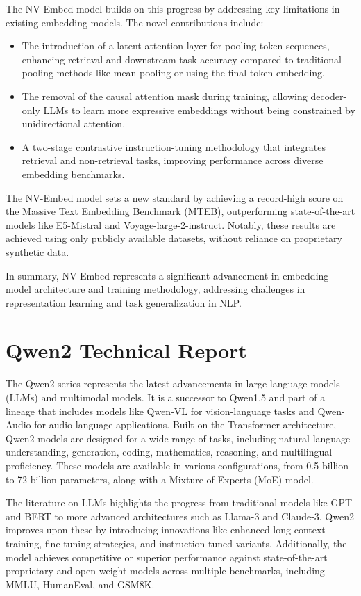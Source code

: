 The NV-Embed model builds on this progress by addressing key limitations in existing embedding models. The novel contributions include:
\begin{itemize}
    \item The introduction of a latent attention layer for pooling token sequences, enhancing retrieval and downstream task accuracy compared to traditional pooling methods like mean pooling or using the final token embedding.
    \item The removal of the causal attention mask during training, allowing decoder-only LLMs to learn more expressive embeddings without being constrained by unidirectional attention.
    \item A two-stage contrastive instruction-tuning methodology that integrates retrieval and non-retrieval tasks, improving performance across diverse embedding benchmarks.
\end{itemize}

The NV-Embed model sets a new standard by achieving a record-high score on the Massive Text Embedding Benchmark (MTEB), outperforming state-of-the-art models like E5-Mistral and Voyage-large-2-instruct. Notably, these results are achieved using only publicly available datasets, without reliance on proprietary synthetic data.

In summary, NV-Embed represents a significant advancement in embedding model architecture and training methodology, addressing challenges in representation learning and task generalization in NLP.

\section*{Qwen2 Technical Report\cite{qwen2.5}}
The Qwen2 series represents the latest advancements in large language models (LLMs) and multimodal models. It is a successor to Qwen1.5 and part of a lineage that includes models like Qwen-VL for vision-language tasks and Qwen-Audio for audio-language applications. Built on the Transformer architecture, Qwen2 models are designed for a wide range of tasks, including natural language understanding, generation, coding, mathematics, reasoning, and multilingual proficiency. These models are available in various configurations, from 0.5 billion to 72 billion parameters, along with a Mixture-of-Experts (MoE) model.

The literature on LLMs highlights the progress from traditional models like GPT and BERT to more advanced architectures such as Llama-3 and Claude-3. Qwen2 improves upon these by introducing innovations like enhanced long-context training, fine-tuning strategies, and instruction-tuned variants. Additionally, the model achieves competitive or superior performance against state-of-the-art proprietary and open-weight models across multiple benchmarks, including MMLU, HumanEval, and GSM8K.

